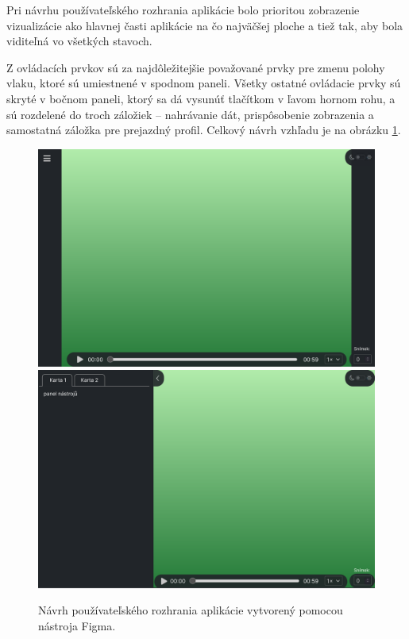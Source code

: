 Pri návrhu používateľského rozhrania aplikácie bolo prioritou zobrazenie vizualizácie ako hlavnej časti aplikácie na čo najväčšej ploche a tiež tak, aby bola viditeľná vo všetkých stavoch.

Z ovládacích prvkov sú za najdôležitejšie považované prvky pre zmenu polohy vlaku, ktoré sú umiestnené v spodnom paneli. Všetky ostatné ovládacie prvky sú skryté v bočnom paneli, ktorý sa dá vysunúť tlačítkom v ľavom hornom rohu, a sú rozdelené do troch záložiek -- nahrávanie dát, prispôsobenie zobrazenia a samostatná záložka pre prejazdný profil. Celkový návrh vzhľadu je na obrázku \ref{fig:navrh_gui}.

\begin{figure}[h]
    \centering
    \includegraphics[width=0.9\linewidth]{text_prace/obrazky-figures/navrh1.pdf}
    \includegraphics[width=0.9\linewidth]{text_prace/obrazky-figures/navrh2.pdf}
    \caption{Návrh používateľského rozhrania aplikácie vytvorený pomocou nástroja Figma.}
    \label{fig:navrh_gui}
\end{figure}

